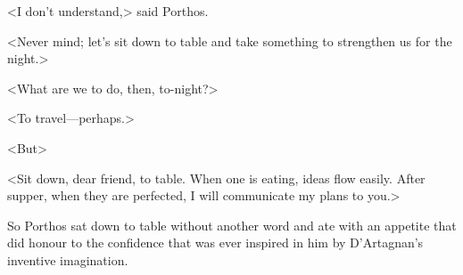 <I don't understand,> said Porthos.

<Never mind; let's sit down to table and take something to strengthen us for the night.>

<What are we to do, then, to-night?>

<To travel—perhaps.>

<But\longdash>

<Sit down, dear friend, to table. When one is eating, ideas flow easily. After supper, when they are perfected, I will communicate my plans to you.>

So Porthos sat down to table without another word and ate with an appetite that did honour to the confidence that was ever inspired in him by D'Artagnan's inventive imagination. 